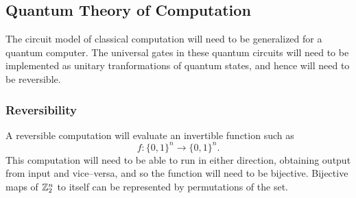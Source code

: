 


\subsection{Quantum Theory of Computation}

The circuit model of classical computation will need to be generalized
for a quantum computer.  The universal gates in these quantum circuits
will need to be implemented as unitary tranformations of quantum
states, and hence will need to be reversible.

\subsubsection{Reversibility}

A reversible computation will evaluate an invertible function
such as
\begin{equation}
f\colon\lbrace 0,1\rbrace^n \to\lbrace 0,1\rbrace^n.
\end{equation}
This computation will need to be able to run in either direction,
obtaining output from input and vice--versa, and so the function
will need to be bijective.  Bijective maps of ${\mathbb{Z}}_2^n$ to itself
can be represented by permutations of the set.

